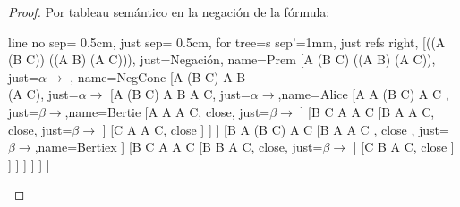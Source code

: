 \documentclass[letterpaper,12pt]{memoir}
\theoremstyle{definition}
\begin{document}
\begin{proof}
  Por tableau semántico en la negación de la fórmula:\\
  \noindent

  \begin{tableau}
    {
      line no sep= 0.5cm,
      just sep= 0.5cm,
      for tree={s sep'=1mm},
      just refs right, %
    }
    [\neg((A \rightarrow (B \rightarrow C)) \rightarrow ((A \rightarrow B) \rightarrow (A \rightarrow C))), just={Negación}, name=Prem
    [A \rightarrow (B \rightarrow C) \text{,} \neg ((A \rightarrow B) \rightarrow (A \rightarrow C)), just={\(\alpha \rightarrow\) }, name=NegConc
    [A \rightarrow (B \rightarrow C) \text{,} A \rightarrow B \text{,} \\ \neg(A \rightarrow C), just={\(\alpha \rightarrow\)}
    [A \rightarrow (B \rightarrow C) \text{,} A \rightarrow B \text{,} A \text{,} \neg C, just={\(\alpha \rightarrow\)},name=Alice
    [\neg A \text{,} A \rightarrow (B \rightarrow C) \text{,} A\text{,} \neg C , just={\(\beta \rightarrow\)},name=Bertie
    [\neg A \text{,} \neg A  \text{,} A  \text{,} \neg C, close, just={\(\beta \rightarrow\)}
    ]
    [B \rightarrow C \text{,} \neg A  \text{,} A  \text{,} \neg C
    [\neg B \text{,} \neg A \text{,} A \text{,} \neg C, close, just={\(\beta \rightarrow\)}
    ]
    [C \text{,} \neg A \text{,} A \text{,} \neg C, close
    ]
    ]
    ]
    [B \text{,} A \rightarrow (B \rightarrow C) \text{,} A\text{,} \neg C
    [B \text{,} \neg A \text{,} A \text{,} \neg C , close , just={\(\beta \rightarrow\)},name=Bertiex
    ]
    [B \rightarrow C \text{,} \neg A \text{,} A \text{,} \neg C
    [\neg B \text{,} B \text{,} A \text{,} \neg C, close, just={\(\beta \rightarrow\)}
    ]
    [C \text{,} B \text{,} A \text{,} \neg C, close
    ]
    ]
    ]
    ]
    ]
    ]
    ]
  \end{tableau}
  \newline
\end{proof}
\end{document}
